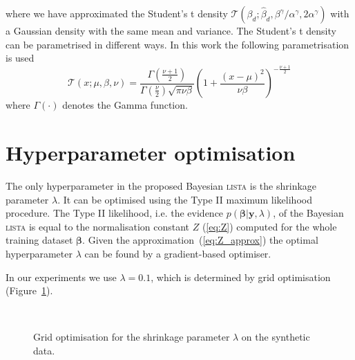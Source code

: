 \documentclass{article}
\begin{document}
where we have approximated the Student's t density $\mathcal{T}\left(\beta_d ; \widehat{\beta}_d, \beta^\gamma / \alpha^\gamma, 2\alpha^\gamma\right)$ with a Gaussian density with the same mean and variance. The Student's t density can be parametrised in different ways. In this work the following parametrisation is used
\begin{equation}
\mathcal{T}(x; \mu, \beta, \nu) = \frac{\Gamma\left(\frac{\nu + 1}{2}\right)}{\Gamma\left(\frac{\nu}{2}\right)\sqrt{\pi \nu \beta}} \left(1 + \frac{(x - \mu)^2}{\nu\beta}\right)^{-\frac{\nu + 1}{2}}
\end{equation}
where $\Gamma(\cdot)$ denotes the Gamma function.

\section{Hyperparameter optimisation}
The only hyperparameter in the proposed Bayesian \textsc{lista} is the shrinkage parameter $\lambda$. It can be optimised using the Type II maximum likelihood procedure. The Type II likelihood, i.e. the evidence $p(\boldsymbol\beta | \mathbf{y}, \lambda)$, of the Bayesian \textsc{lista} is equal to the normalisation constant $Z$ (\ref{eq:Z}) computed for the whole training dataset $\boldsymbol\beta$. Given the approximation~(\ref{eq:Z_approx}) the optimal hyperparameter $\lambda$ can be found by a gradient-based optimiser.

In our experiments we use $\lambda = 0.1$, which is determined by grid optimisation (Figure~\ref{fig:lambda_opt}).

\begin{figure}[h]
\centering
{}~
~
\caption{Grid optimisation for the shrinkage parameter $\lambda$ on the synthetic data.}
\label{fig:lambda_opt}
\end{figure}
\end{document}
